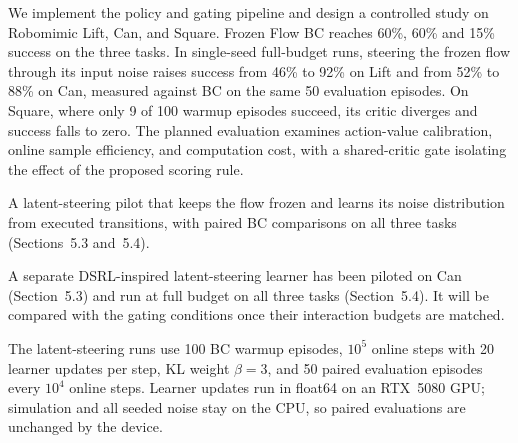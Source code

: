 
We implement the policy and gating pipeline and design a controlled study on
Robomimic Lift, Can, and Square. Frozen Flow BC reaches 60\%, 60\% and 15\%
success on the three tasks. In single-seed full-budget runs, steering the frozen
flow through its input noise raises success from 46\% to 92\% on Lift and from
52\% to 88\% on Can, measured against BC on the same 50 evaluation episodes.
On Square, where only 9 of 100 warmup episodes succeed, its critic diverges and
success falls to zero. The planned evaluation examines action-value calibration,
online sample efficiency, and computation cost, with a shared-critic gate
isolating the effect of the proposed scoring rule.

  \item A latent-steering pilot that keeps the flow frozen and learns its noise
  distribution from executed transitions, with paired BC comparisons on all
  three tasks (Sections~5.3 and~5.4).

A separate DSRL-inspired latent-steering learner has been piloted on Can
(Section~5.3) and run at full budget on all three tasks (Section~5.4). It will
be compared with the gating conditions once their interaction budgets are
matched.

The latent-steering runs use 100 BC warmup episodes, $10^5$ online steps with
20 learner updates per step, KL weight $\beta=3$, and 50 paired evaluation
episodes every $10^4$ online steps. Learner updates run in float64 on an RTX~5080
GPU; simulation and all seeded noise stay on the CPU, so paired evaluations
are unchanged by the device.

